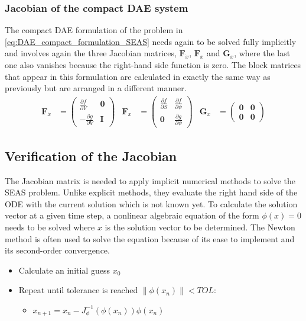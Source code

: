 \subsubsection{Jacobian of the compact DAE system}
The compact DAE formulation of the problem in \autoref{eq:DAE_compact_formulation_SEAS} needs again to be solved fully implicitly and involves again the three Jacobian matrices, $\mathbf{F}_{\dot{x}}$, $\mathbf{F}_x$ and $\mathbf{G}_x$, where the last one also vanishes because the right-hand side function is zero. The block matrices that appear in this formulation are calculated in exactly the same way as previously but are arranged in a different manner.
\begin{align}
	\mathbf{F}_{\dot{x}}&=  \begin{pmatrix}
								\frac{\partial f}{\partial V} & \mathbf{0} \\
							   -\frac{\partial g}{\partial V} & \mathbf{I}
							\end{pmatrix} & 
	\mathbf{F}_x        &=  \begin{pmatrix}
								\frac{\partial f}{\partial S} & \frac{\partial f}{\partial \psi} \\
								\mathbf{0}                    & \frac{\partial g}{\partial \psi}
							\end{pmatrix} & 
	\mathbf{G}_x        &=  \begin{pmatrix}
								\mathbf{0} & \mathbf{0} \\
							    \mathbf{0} & \mathbf{0}
							\end{pmatrix}
\end{align}

\subsection{Verification of the Jacobian}
The Jacobian matrix is needed to apply implicit numerical methods to solve the SEAS problem. Unlike explicit methods, they evaluate the right hand side of the ODE with the current solution which is not known yet. To calculate the solution vector at a given time step, a nonlinear algebraic equation of the form $\phi(x) = 0$ needs to be solved where $x$ is the solution vector to be determined. The Newton method is often used to solve the equation because of its ease to implement and its second-order convergence. 

\begin{itemize}
	\item Calculate an initial guess $x_0$
	\item Repeat until tolerance is reached $\|\phi(x_n)\| < TOL$: 
	\begin{itemize}
		\item $x_{n+1} = x_n - J_\phi^{-1}(\phi(x_n)) \phi(x_n)$
	\end{itemize} 
\end{itemize}


